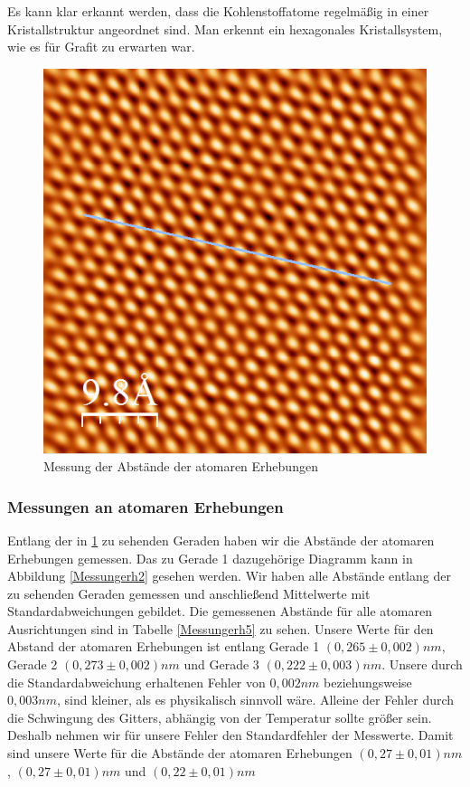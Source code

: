 \documentclass[10pt,a4paper]{article}
\begin{document}
Es kann klar erkannt werden, dass die Kohlenstoffatome regelmäßig in einer Kristallstruktur angeordnet sind. Man erkennt ein hexagonales Kristallsystem, wie es für Grafit zu erwarten war.

\begin{figure}[h]
	\centering
	
	\includegraphics[scale = 0.4]{Aufnahme_Ebene_doppelte_fourier2.png}
	
	\caption{Messung der Abstände der atomaren Erhebungen}
	\label{Messungerh1}
\end{figure}

\subsubsection{Messungen an atomaren Erhebungen} \label{kapitolo}

Entlang der in \ref{Messungerh1} zu sehenden Geraden haben wir die Abstände der atomaren Erhebungen gemessen. Das zu Gerade 1 dazugehörige Diagramm kann in Abbildung \ref{Messungerh2} gesehen werden. Wir haben alle Abstände entlang der zu sehenden Geraden gemessen und anschließend Mittelwerte mit Standardabweichungen gebildet. Die gemessenen Abstände für alle atomaren Ausrichtungen sind in Tabelle \ref{Messungerh5} zu sehen. Unsere Werte für den Abstand der atomaren Erhebungen ist entlang Gerade 1 $(0,265 \pm 0,002) nm$, Gerade 2 $(0,273 \pm 0,002) nm$ und Gerade 3 $(0,222 \pm 0,003) nm$. Unsere durch die Standardabweichung erhaltenen Fehler von $0,002 nm$ beziehungsweise $0,003 nm$, sind kleiner, als es physikalisch sinnvoll wäre. Alleine der Fehler durch die Schwingung des Gitters, abhängig von der Temperatur sollte größer sein. Deshalb nehmen wir für unsere Fehler den Standardfehler der Messwerte. Damit sind unsere Werte für die Abstände der atomaren Erhebungen $(0,27 \pm 0,01) nm$, $(0,27 \pm 0,01) nm$ und $(0,22 \pm 0,01) nm$
\end{document}
